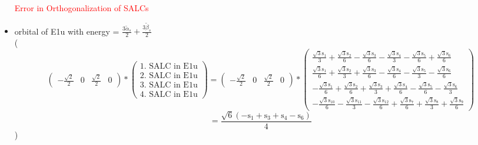 \documentclass[12pt,a4paper]{article}
\begin{document}
\begin{itemize}
\textcolor{red}{Error in Orthogonalization of SALCs}\item orbital of E1u with energy = 
                                $\frac{3 \tilde{\alpha}_{s}}{2} + \frac{3 \tilde{\beta}_{s}}{2}$ \\
( 
$$
\begin{pmatrix}- \frac{\sqrt{2}}{2} & 0 & \frac{\sqrt{2}}{2} & 0\end{pmatrix} * \left(\begin{array}{c}\text{1. SALC in E1u} \\ \text{2. SALC in E1u} \\ \text{3. SALC in E1u} \\ \text{4. SALC in E1u}\end{array}\right) = \begin{pmatrix}- \frac{\sqrt{2}}{2} & 0 & \frac{\sqrt{2}}{2} & 0\end{pmatrix} * \begin{pmatrix}\frac{\sqrt{3} \text{s}_{1}}{3} + \frac{\sqrt{3} \text{s}_{2}}{6} - \frac{\sqrt{3} \text{s}_{3}}{6} - \frac{\sqrt{3} \text{s}_{4}}{3} - \frac{\sqrt{3} \text{s}_{5}}{6} + \frac{\sqrt{3} \text{s}_{6}}{6}\\\frac{\sqrt{3} \text{s}_{1}}{6} + \frac{\sqrt{3} \text{s}_{2}}{3} + \frac{\sqrt{3} \text{s}_{3}}{6} - \frac{\sqrt{3} \text{s}_{4}}{6} - \frac{\sqrt{3} \text{s}_{5}}{3} - \frac{\sqrt{3} \text{s}_{6}}{6}\\- \frac{\sqrt{3} \text{s}_{1}}{6} + \frac{\sqrt{3} \text{s}_{2}}{6} + \frac{\sqrt{3} \text{s}_{3}}{3} + \frac{\sqrt{3} \text{s}_{4}}{6} - \frac{\sqrt{3} \text{s}_{5}}{6} - \frac{\sqrt{3} \text{s}_{6}}{3}\\- \frac{\sqrt{3} \text{s}_{10}}{6} - \frac{\sqrt{3} \text{s}_{11}}{3} - \frac{\sqrt{3} \text{s}_{12}}{6} + \frac{\sqrt{3} \text{s}_{7}}{6} + \frac{\sqrt{3} \text{s}_{8}}{3} + \frac{\sqrt{3} \text{s}_{9}}{6}\end{pmatrix} 
 $$ $$ = \frac{\sqrt{6} \left(- \text{s}_{1} + \text{s}_{3} + \text{s}_{4} - \text{s}_{6}\right)}{4} 
 $$ 
 )


\end{itemize}
\end{document}
